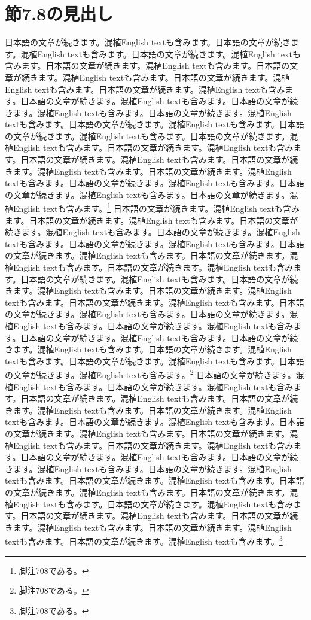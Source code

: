 \documentclass[pdflatex,book]{jlreq}
\begin{document}
\section{節7.8の見出し}
日本語の文章が続きます。混植English textも含みます。日本語の文章が続きます。混植English textも含みます。日本語の文章が続きます。混植English textも含みます。日本語の文章が続きます。混植English textも含みます。日本語の文章が続きます。混植English textも含みます。日本語の文章が続きます。混植English textも含みます。日本語の文章が続きます。混植English textも含みます。日本語の文章が続きます。混植English textも含みます。日本語の文章が続きます。混植English textも含みます。日本語の文章が続きます。混植English textも含みます。日本語の文章が続きます。混植English textも含みます。日本語の文章が続きます。混植English textも含みます。日本語の文章が続きます。混植English textも含みます。日本語の文章が続きます。混植English textも含みます。日本語の文章が続きます。混植English textも含みます。日本語の文章が続きます。混植English textも含みます。日本語の文章が続きます。混植English textも含みます。日本語の文章が続きます。混植English textも含みます。日本語の文章が続きます。混植English textも含みます。日本語の文章が続きます。混植English textも含みます。\footnote{脚注708である。}
日本語の文章が続きます。混植English textも含みます。日本語の文章が続きます。混植English textも含みます。日本語の文章が続きます。混植English textも含みます。日本語の文章が続きます。混植English textも含みます。日本語の文章が続きます。混植English textも含みます。日本語の文章が続きます。混植English textも含みます。日本語の文章が続きます。混植English textも含みます。日本語の文章が続きます。混植English textも含みます。日本語の文章が続きます。混植English textも含みます。日本語の文章が続きます。混植English textも含みます。日本語の文章が続きます。混植English textも含みます。日本語の文章が続きます。混植English textも含みます。日本語の文章が続きます。混植English textも含みます。日本語の文章が続きます。混植English textも含みます。日本語の文章が続きます。混植English textも含みます。日本語の文章が続きます。混植English textも含みます。日本語の文章が続きます。混植English textも含みます。日本語の文章が続きます。混植English textも含みます。日本語の文章が続きます。混植English textも含みます。日本語の文章が続きます。混植English textも含みます。\footnote{脚注708である。}
日本語の文章が続きます。混植English textも含みます。日本語の文章が続きます。混植English textも含みます。日本語の文章が続きます。混植English textも含みます。日本語の文章が続きます。混植English textも含みます。日本語の文章が続きます。混植English textも含みます。日本語の文章が続きます。混植English textも含みます。日本語の文章が続きます。混植English textも含みます。日本語の文章が続きます。混植English textも含みます。日本語の文章が続きます。混植English textも含みます。日本語の文章が続きます。混植English textも含みます。日本語の文章が続きます。混植English textも含みます。日本語の文章が続きます。混植English textも含みます。日本語の文章が続きます。混植English textも含みます。日本語の文章が続きます。混植English textも含みます。日本語の文章が続きます。混植English textも含みます。日本語の文章が続きます。混植English textも含みます。日本語の文章が続きます。混植English textも含みます。日本語の文章が続きます。混植English textも含みます。日本語の文章が続きます。混植English textも含みます。日本語の文章が続きます。混植English textも含みます。\footnote{脚注708である。}
\end{document}

